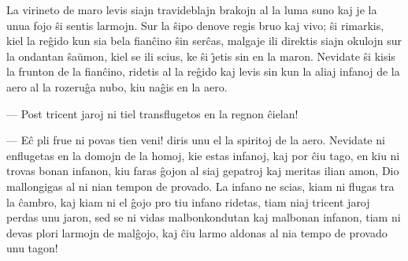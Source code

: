    La virineto de maro levis siajn travideblajn brakojn al la luma suno
kaj je la unua fojo \^si sentis larmojn. Sur la \^sipo denove regis
bruo kaj vivo; \^si rimarkis, kiel la re\^gido kun sia bela
fian\^cino \^sin ser\^cas, malgaje ili direktis siajn okulojn sur la
ondantan \^sa\u umon, kiel se ili scius, ke \^si \^{\j}etis sin en
la maron. Nevidate \^si kisis la frunton de la fian\^cino, ridetis
al la re\^gido kaj levis sin kun la aliaj infanoj de la aero al la
rozeru\^ga nubo, kiu na\^gis en la aero.

 --- Post tricent jaroj ni tiel transflugetos en la regnon \^cielan!

 --- E\^c pli frue ni povas tien veni! diris unu el la spiritoj de
la aero. Nevidate ni enflugetas en la domojn de la homoj, kie estas
infanoj, kaj por \^ciu tago, en kiu ni trovas bonan infanon, kiu
faras \^gojon al siaj gepatroj kaj meritas ilian amon, Dio
mallongigas al ni nian tempon de provado. La infano ne scias, kiam
ni flugas tra la \^cambro, kaj kiam ni el \^gojo pro tiu infano
ridetas, tiam niaj tricent jaroj perdas unu jaron, sed se ni vidas
malbonkondutan kaj malbonan infanon, tiam ni devas plori larmojn de
mal\^gojo, kaj \^ciu larmo aldonas al nia tempo de provado unu
tagon!

\smallrule{}
